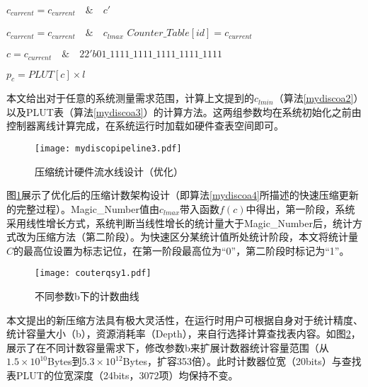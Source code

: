 \begin{algorithm}[!h]
{{{{					$ 	c_{current} = c_{current} \quad \&\quad c' 	 $
					
				}{
					$ 	c_{current} = c_{current} \quad \&\quad c_{lmax}	 $
				}
				$ Counter\_Table[id] = c_{current} $  
			}{
				
				$ c = c_{current} \quad \&\quad 22'b{01\_1111\_1111\_1111\_1111\_1111} $
				
				$ p_c = PLUT[c] \times l $
				
			}			
		}
	}
\end{algorithm}

本文给出对于任意的系统测量需求范围，计算上文提到的$ c_{lmin} $（算法\ref{mydiscoa2}）以及PLUT表（算法\ref{mydiscoa3}）的计算方法。这两组参数均在系统初始化之前由控制器离线计算完成，在系统运行时加载如硬件查表空间即可。



\begin{figure}[!ht]
	\centering 
	\vspace{-1.5mm}
	\texttt{[image: mydiscopipeline3.pdf]}
	\caption{压缩统计硬件流水线设计（优化）} \label{fig:mydiscopipeline}
\end{figure}

图\ref{fig:mydiscopipeline}展示了优化后的压缩计数架构设计（即算法\ref{mydiscoa4}所描述的快速压缩更新的完整过程）。Magic\_Number值由$c_{lmax}$带入函数$f(c)$中得出，第一阶段，系统采用线性增长方式，系统判断当线性增长的统计量大于Magic\_Number后，统计方式改为压缩方法（第二阶段）。为快速区分某统计值所处统计阶段，本文将统计量$ C $的最高位设置为标志记位，在第一阶段最高位为“0”，第二阶段时标记为“1”。

\begin{figure}[!ht]
	\centering 
	\vspace{-1.5mm}
	\texttt{[image: couterqsy1.pdf]}
	\caption{不同参数b下的计数曲线} \label{fig:couterqsy1}
\end{figure}

本文提出的新压缩方法具有极大灵活性，在运行时用户可根据自身对于统计精度、统计容量大小（b），资源消耗率（Depth），来自行选择计算查找表内容。如图\ref{fig:couterqsy1}，展示了在不同计数容量需求下，修改参数b来扩展计数器统计容量范围（从$1.5\times 10^{10}$Bytes到$5.3\times 10^{12}$Bytes，扩容353倍）。此时计数器位宽（20bits）与查找表PLUT的位宽深度（24bits，3072项）均保持不变。

